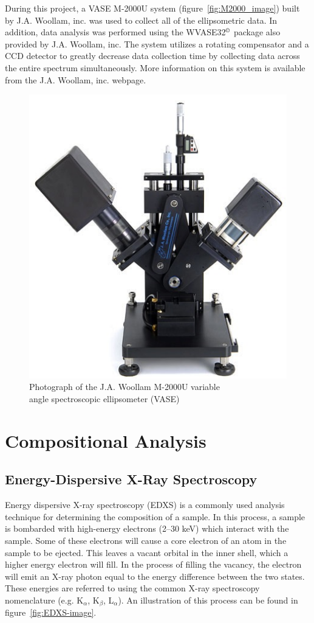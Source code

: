 During this project, a VASE M-2000U system (figure~\vref{fig:M2000_image}) built by J.A. Woollam, inc. was used to collect all of the ellipsometric data. In addition, data analysis was performed using the WVASE32{$^{\copyright}$} package also provided by J.A. Woollam, inc. The system utilizes a rotating compensator and a CCD detector to greatly decrease data collection time by collecting data across the entire spectrum simultaneously.  More information on this system is available from the J.A. Woollam, inc. webpage.\cite{woollam-web}

\begin{figure}[htbp]
   \centering
   \includegraphics[width=0.5\linewidth]{./figures/characterization/M2000_ellipsometer_image.png} 
   \caption[J.A. Woollam M-2000U Ellipsometer]%
   		{Photograph of the J.A. Woollam M-2000U variable \\%
   		 angle spectroscopic ellipsometer (VASE)}
   \label{fig:M2000_image}
\end{figure}





\section{Compositional Analysis}
\label{sec:Charact-Comp}

\subsection{Energy-Dispersive X-Ray Spectroscopy}

Energy dispersive X-ray spectroscopy (EDXS) is a commonly used analysis technique for determining the composition of a sample. In this process, a sample is bombarded with high-energy electrons (2--30 keV) which interact with the sample. Some of these electrons will cause a core electron of an atom in the sample to be ejected. This leaves a vacant orbital in the inner shell, which a higher energy electron will fill. In the process of filling the vacancy, the electron will emit an X-ray photon equal to the energy difference between the two states. These energies are referred to using the common X-ray spectroscopy nomenclature (e.g. K$_{\alpha}$, K$_{\beta}$, L$_{\alpha}$). An illustration of this process can be found in figure~\vref{fig:EDXS-image}.  

